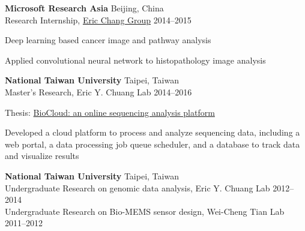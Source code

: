 \begin{entrylist}
\item \textbf{Microsoft Research Asia} \hfill Beijing, China\\
Research Internship, \href{https://www.microsoft.com/en-us/research/people/echang/}{Eric Chang Group} \hfill
2014--2015
\begin{detaillist}
    \item Deep learning based cancer image and pathway analysis
    \item Applied convolutional neural network to histopathology image analysis
\end{detaillist}

\item \textbf{National Taiwan University} \hfill Taipei, Taiwan\\
Master's Research, Eric Y. Chuang Lab \hfill
2014--2016
\begin{detaillist}
    \item Thesis: \href{https://doi.org/10.6342/NTU201601295}{BioCloud: an online sequencing analysis platform}
    \item Developed a cloud platform to process and analyze sequencing data, including a web portal, a data processing job queue scheduler, and a database to track data and visualize results
\end{detaillist}

\item \textbf{National Taiwan University} \hfill Taipei, Taiwan\\
Undergraduate Research on genomic data analysis, Eric Y. Chuang Lab \hfill
2012--2014\\
Undergraduate Research on Bio-MEMS sensor design, Wei-Cheng Tian Lab \hfill
2011--2012

\end{entrylist}
